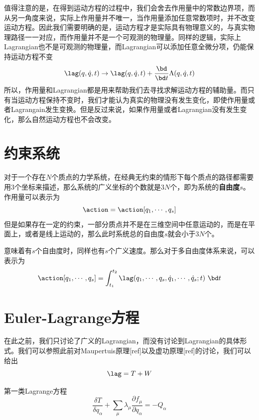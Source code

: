 值得注意的是，在得到运动方程的过程中，我们会舍去作用量中的常数边界项，而从另一角度来说，实际上作用量并不唯一，当作用量添加任意常数项时，并不改变运动方程。因此我们需要明确的是，运动方程才是实际具有物理意义的，与真实物理路径一一对应，而作用量并不是一个可观测的物理量。同样的逻辑，实际上Lagrangian也不是可观测的物理量，而Lagrangian可以添加任意全微分项，仍能保持运动方程不变
\begin{equation}
    \lag(q,\dot q,t) \rightarrow \lag(q,\dot q,t) + \frac{\bd }{\bd t}\Lambda(q,\dot q,t)
\end{equation}
所以，作用量和Lagrangian都是用来帮助我们去寻找求解运动方程的辅助量。而只有当运动方程保持不变时，我们才能认为真实的物理没有发生变化，即使作用量或者Lagrangain发生变换。但是反过来说，如果作用量或者Lagrangian没有发生变化，那么自然运动方程也不会改变。
\section{约束系统}
\label{sec:constraint}
对于一个存在$N$个质点的力学系统，在经典无约束的情形下每个质点的路径都需要用3个坐标来描述，那么系统的广义坐标的个数就是$3N$个，即为系统的\textbf{自由度}$s$。作用量可以表示为
\begin{equation}
    \action = \action[q_1,\cdots,q_s]
\end{equation}
但是如果存在一定的约束，一部分质点并不是在三维空间中任意运动的，而是在平面上，或者是线上运动的，那么此时系统总的自由度$s$就会小于$3N$个。

意味着有$s$个自由度时，同样也有$s$个广义速度。那么对于多自由度体系来说，可以表示为
\begin{equation}
    \action [q_1,\cdots,q_s] = \int_{t_1} ^{t_2} \lag(q_1,\cdots,q_s,\dot{q}_1,\cdots,\dot q_s;t) ~\bd t 
\end{equation}

\section{Euler-Lagrange方程}
\label{sec:eom}
在此之前，我们只讨论了广义的Lagrangian，而没有讨论到Lagrangian的具体形式。我们可以参照此前对Maupertuis原理[ref]以及虚功原理[ref]的讨论，我们可以给出
\begin{equation}
    \lag = T+W
\end{equation}


第一类Lagrange方程\cite{Lagrange1788a}
\begin{equation}
    \frac{\delta T}{\delta q_\alpha} + \sum_\mu \lambda_\mu \frac{\partial f_\mu}{\partial q_\alpha}=-Q_\alpha
\end{equation}


